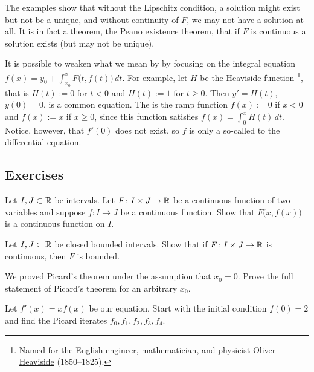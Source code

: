 The examples show that without the Lipschitz condition, a solution might
exist but not be a unique, and without continuity of $F$, we may not
have a solution at all.
It is in fact a theorem, the Peano existence theorem, that if $F$ is
continuous a solution exists (but may not be unique).

\begin{remark}
It is possible to weaken what we mean by 
by focusing on the integral equation
$f(x) = y_0 + \int_{x_0}^x F\bigl(t,f(t)\bigr) \, dt$.  For example,
let $H$ be the
Heaviside function%
\footnote{Named
for the English engineer, mathematician, and physicist
\href{https://en.wikipedia.org/wiki/Oliver_Heaviside}{Oliver Heaviside}
(1850--1825).},
that is $H(t) := 0$ for $t < 0$ and $H(t) := 1$ for $t \geq 0$.
Then
$y' = H(t)$, $y(0) = 0$,
is a common equation.
The 
is the ramp function $f(x) := 0$ if $x < 0$ and $f(x) := x$ if $x \geq 0$,
since this function satisfies
$f(x) = \int_0^x H(t)\, dt$.  Notice, however, that $f'(0)$ does not exist,
so $f$ is only a so-called \emph{} to the
differential equation.
\end{remark}


\subsection{Exercises}

\begin{exercise}
Let $I, J \subset {\mathbb{R}}$ be intervals.
Let $F \colon I \times J \to {\mathbb{R}}$ be a continuous function
of two variables
and suppose $f \colon I \to J$ be a continuous function.
Show that $F\bigl(x,f(x)\bigr)$ is a continuous function on $I$.
\end{exercise}

\begin{exercise}
Let $I, J \subset {\mathbb{R}}$ be closed bounded intervals.
Show that if $F \colon I \times J \to {\mathbb{R}}$ is continuous,
then $F$ is bounded.
\end{exercise}

\begin{exercise}
We proved Picard's theorem under the assumption that $x_0 = 0$.
Prove the full statement of Picard's theorem for an arbitrary $x_0$.
\end{exercise}

\begin{exercise}
Let $f'(x)=x f(x)$ be our equation.  Start with the initial condition
$f(0)=2$ and find the Picard iterates $f_0,f_1,f_2,f_3,f_4$.
\end{exercise}

